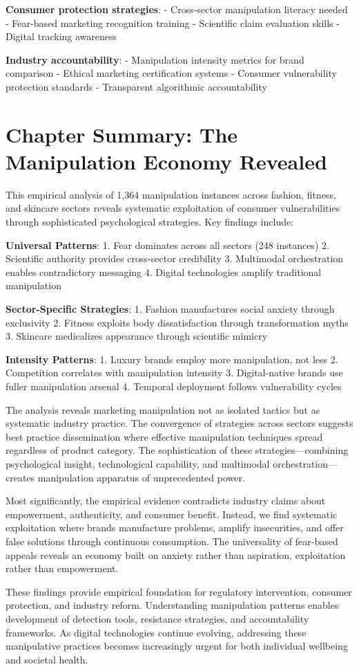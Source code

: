 \textbf{Consumer protection strategies}:
- Cross-sector manipulation literacy needed
- Fear-based marketing recognition training
- Scientific claim evaluation skills
- Digital tracking awareness

\textbf{Industry accountability}:
- Manipulation intensity metrics for brand comparison
- Ethical marketing certification systems
- Consumer vulnerability protection standards
- Transparent algorithmic accountability

\section{Chapter Summary: The Manipulation Economy Revealed}
\label{sec:empirical_summary}

This empirical analysis of 1,364 manipulation instances across fashion, fitness, and skincare sectors reveals systematic exploitation of consumer vulnerabilities through sophisticated psychological strategies. Key findings include:

\textbf{Universal Patterns}:
1. Fear dominates across all sectors (248 instances)
2. Scientific authority provides cross-sector credibility
3. Multimodal orchestration enables contradictory messaging
4. Digital technologies amplify traditional manipulation

\textbf{Sector-Specific Strategies}:
1. Fashion manufactures social anxiety through exclusivity
2. Fitness exploits body dissatisfaction through transformation myths
3. Skincare medicalizes appearance through scientific mimicry

\textbf{Intensity Patterns}:
1. Luxury brands employ more manipulation, not less
2. Competition correlates with manipulation intensity
3. Digital-native brands use fuller manipulation arsenal
4. Temporal deployment follows vulnerability cycles

The analysis reveals marketing manipulation not as isolated tactics but as systematic industry practice. The convergence of strategies across sectors suggests best practice dissemination where effective manipulation techniques spread regardless of product category. The sophistication of these strategies—combining psychological insight, technological capability, and multimodal orchestration—creates manipulation apparatus of unprecedented power.

Most significantly, the empirical evidence contradicts industry claims about empowerment, authenticity, and consumer benefit. Instead, we find systematic exploitation where brands manufacture problems, amplify insecurities, and offer false solutions through continuous consumption. The universality of fear-based appeals reveals an economy built on anxiety rather than aspiration, exploitation rather than empowerment.

These findings provide empirical foundation for regulatory intervention, consumer protection, and industry reform. Understanding manipulation patterns enables development of detection tools, resistance strategies, and accountability frameworks. As digital technologies continue evolving, addressing these manipulative practices becomes increasingly urgent for both individual wellbeing and societal health.
